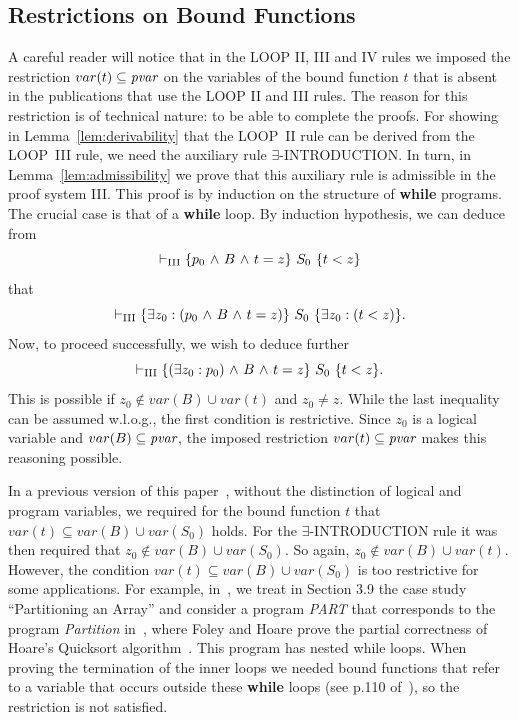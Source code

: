 \documentclass[manuscript, screen, review]{acmart}
\begin{document}
\subsection{Restrictions on Bound Functions}

A careful reader will notice that in the LOOP II, III and IV rules we
imposed the restriction $var(t) \subseteq \mbox{\it pvar}$ on the
variables of the bound function $t$ that is absent in the publications
that use the LOOP II and III rules.
The reason for this restriction is of technical nature: to be able 
to complete the proofs.
For showing in Lemma~\ref{lem:derivability} that the LOOP~II rule can
be derived from the LOOP~III rule, we need the auxiliary rule
$\exists$-INTRODUCTION. In turn, in Lemma~\ref{lem:admissibility}
we prove that this auxiliary rule is admissible in the proof system III.
This proof is by induction on the structure of {\bf while} programs.
The crucial case is that of a {\bf while} loop. By induction hypothesis,
we can deduce from 
\[
 \vdash_{\rm{III}} \mbox{$\{{p_{0} \mbox{$\ \wedge\ $} B \mbox{$\ \wedge\ $} t = z}\}\ {S_0}\ \{{t < z}\}$}
\]
that
\[
 \vdash_{\rm{III}} \mbox{$\{{\mbox{$\exists$} z_0: (p_{0} \mbox{$\ \wedge\ $} B \mbox{$\ \wedge\ $} t = z)}\}\ {S_0}\ \{{\mbox{$\exists$} z_0: (t < z)}\}$}.
\]
Now, to proceed successfully, we wish to deduce further 
\[
 \vdash_{\rm{III}} \mbox{$\{{(\mbox{$\exists$} z_0:p_0) \mbox{$\ \wedge\ $} B \mbox{$\ \wedge\ $} t = z}\}\ {S_0}\ \{{t < z}\}$}.
\]
This is possible if $z_0 \not\in var(B) \cup var(t)$ and $z_0 \neq z$.
While the last inequality can be assumed w.l.o.g., the first condition
is restrictive.
Since $z_0$ is a logical variable and $var(B) \subseteq \mbox{\it pvar}$,
the imposed restriction $var(t) \subseteq \mbox{\it pvar}$ makes this reasoning
possible.

In a previous version of this paper~\cite{ABO25}, 
without the distinction of logical and program variables,
we required for the bound function $t$ that $var(t) \subseteq var(B) \cup var(S_0)$
holds. For the $\exists$-INTRODUCTION rule it was then required that 
$z_0 \not\in var(B) \cup var(S_0)$.
So again,  $z_0 \not\in var(B) \cup var(t)$.
However, the  condition $var(t) \subseteq var(B) \cup var(S_0)$ is too restrictive 
for some applications. For example, in~\cite{ABO09}, we treat in Section 3.9 the case study
``Partitioning an Array'' and consider a program {\it PART} that corresponds to
the program {\it Partition} in~\cite{FH71}, where Foley and Hoare prove the partial correctness
of Hoare's Quicksort algorithm~\cite{Hoa61b}.
This program has nested while loops. When proving the termination of the inner loops we needed
bound functions that refer to a variable that occurs outside these {\bf while} loops
(see p.110 of~\cite{ABO09}), so the restriction is not satisfied.
\end{document}
